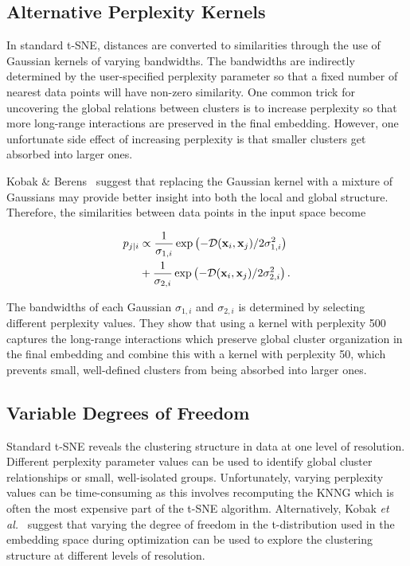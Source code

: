 \documentclass[twocolumn]{bmcart}
\begin{document}
\subsection*{Alternative Perplexity Kernels}

In standard t-SNE, distances are converted to similarities through the use of
Gaussian kernels of varying bandwidths. The bandwidths are indirectly
determined by the user-specified perplexity parameter so that a fixed number of
nearest data points will have non-zero similarity. One common trick for
uncovering the global relations between clusters is to increase perplexity so
that more long-range interactions are preserved in the final embedding.
However, one unfortunate side effect of increasing perplexity is that smaller
clusters get absorbed into larger ones.

Kobak \& Berens~\cite{kobak2019art} suggest that replacing the Gaussian kernel
with a mixture of Gaussians may provide better insight into both the local and
global structure. Therefore, the similarities between data points in the input
space become

\begin{align}
  p_{j\mid i} &\propto \frac{1}{\sigma_{1,i}} \exp \left ( -\mathcal{D}(\mathbf{x}_i, \mathbf{x}_j ) / 2\sigma_{1,i}^2 \right ) \notag \\
  &+ \frac{1}{\sigma_{2,i}} \exp \left ( -\mathcal{D}(\mathbf{x}_i, \mathbf{x}_j ) / 2\sigma_{2,i}^2 \right ).
\end{align}

The bandwidths of each Gaussian $\sigma_{1,i}$ and $\sigma_{2,i}$ is determined
by selecting different perplexity values. They show that using a kernel with
perplexity 500 captures the long-range interactions which preserve global
cluster organization in the final embedding and combine this with a kernel with
perplexity 50, which prevents small, well-defined clusters from being absorbed
into larger ones.

\subsection*{Variable Degrees of Freedom}

Standard t-SNE reveals the clustering structure in data at one level of
resolution. Different perplexity parameter values can be used to identify
global cluster relationships or small, well-isolated groups. Unfortunately,
varying perplexity values can be time-consuming as this involves recomputing
the KNNG which is often the most expensive part of the t-SNE algorithm.
Alternatively, Kobak \textit{et al.}~\cite{kobak2019heavy} suggest that varying
the degree of freedom in the t-distribution used in the embedding space during
optimization can be used to explore the clustering structure at different
levels of resolution. 
\end{document}
